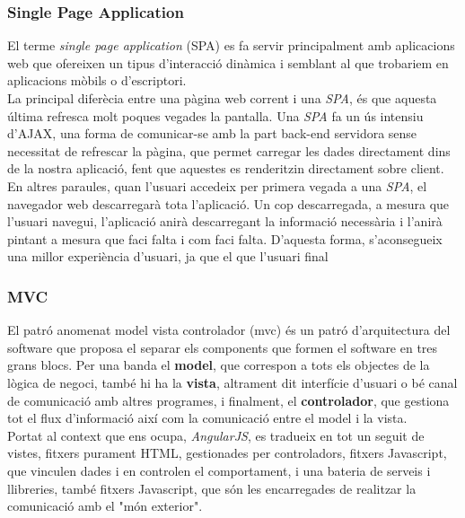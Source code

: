 \subsubsection{Single Page Application}
El terme \textit{single page application} (SPA) es fa servir principalment amb aplicacions web que ofereixen un tipus d'interacció dinàmica i semblant al que trobariem en aplicacions mòbils o d'escriptori.\\
\newline La principal diferècia entre una pàgina web corrent i una \textit{SPA}, és que aquesta última refresca molt poques vegades la pantalla. Una \textit{SPA} fa un ús intensiu d'AJAX, una forma de comunicar-se amb la part back-end servidora sense necessitat de refrescar la pàgina, que permet carregar les dades directament dins de la nostra aplicació, fent que aquestes es renderitzin directament sobre client.\\
\newline En altres paraules, quan l'usuari accedeix per primera vegada a una \textit{SPA}, el navegador web descarregarà tota l'aplicació. Un cop descarregada, a mesura que l'usuari navegui, l'aplicació anirà descarregant la informació necessària i l'anirà pintant a mesura que faci falta i com faci falta. D'aquesta forma, s'aconsegueix una millor experiència d'usuari, ja que el que l'usuari final 

\subsubsection{MVC}
El patró anomenat model vista controlador (mvc) és un patró d'arquitectura del software que proposa el separar els components que formen el software en tres grans blocs. Per una banda el \textbf{model}, que correspon a tots els objectes de la lògica de negoci, també hi ha la \textbf{vista}, altrament dit interfície d'usuari o bé canal de comunicació amb altres programes, i finalment, el \textbf{controlador}, que gestiona tot el flux d'informació així com la comunicació entre el model i la vista.\\
\newline Portat al context que ens ocupa, \textit{AngularJS}, es tradueix en tot un seguit de vistes, fitxers purament HTML, gestionades per controladors, fitxers Javascript, que vinculen dades i en controlen el comportament, i una bateria de serveis i llibreries, també fitxers Javascript, que són les encarregades de realitzar la comunicació amb el "món exterior".


